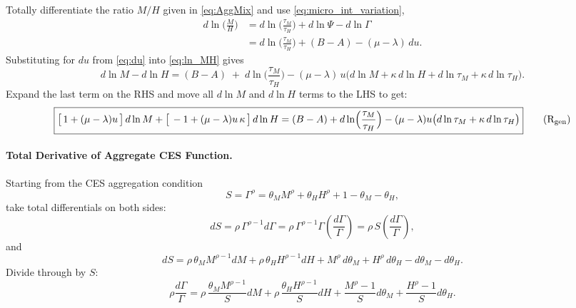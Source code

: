 \documentclass[english]{article}
\begin{document}
Totally differentiate the ratio $M/H$ given in \eqref{eq:AggMix} and use \eqref{eq:micro_int_variation},
\begin{align}
d\ln\!\Big(\frac{M}{H}\Big)
&= d\ln\!\Big(\frac{\tau_M}{\tau_H}\Big) + d\ln\Psi - d\ln\Gamma  \nonumber
\\ 
&= d\ln\!\Big(\frac{\tau_M}{\tau_H}\Big)
+ (B-A) - (\mu-\lambda)\,du.\label{eq:ln_MH}
\end{align}
Substituting for $du$ from \eqref{eq:du} into \eqref{eq:ln_MH} gives
\[
d\ln M - d\ln H
= (B-A) \;+\; d\ln\!\Big(\frac{\tau_M}{\tau_H}\Big) - (\mu-\lambda)\, u\Big(d\ln M + \kappa\,d\ln H + d\ln \tau_M + \kappa\,d\ln \tau_H\Big).
\]
Expand the last term on the RHS and move all $d\ln M$ and $d\ln H$ terms to the LHS to get:
\begin{equation}
\boxed{
\big[\,1 + (\mu-\lambda)u\,\big]\,d\ln M
+ \big[\, -1 + (\mu-\lambda)u\,\kappa\,\big]\,d\ln H
=
(B-A) + d\ln\!\Big(\frac{\tau_M}{\tau_H}\Big)
 - (\mu-\lambda)u\big(d\ln \tau_M + \kappa\,d\ln \tau_H\big)
}
\tag{$\mathrm{R}_{\mathrm{gen}}$}\label{eq:Rgen}
\end{equation}







\paragraph{Total Derivative of Aggregate CES Function.}
Starting from the CES aggregation condition
\[
S = \Gamma^\rho = \theta_M M^\rho + \theta_H H^\rho + 1 - \theta_M - \theta_H,
\]
take total differentials on both sides:
\[
dS
= \rho\,\Gamma^{\rho-1} d\Gamma
= \rho\,\Gamma^{\rho-1} \Gamma \left( \frac{d\Gamma}{\Gamma} \right)
= \rho\,S \left( \frac{d\Gamma}{\Gamma} \right),
\]
and
\[
dS
= \rho\,\theta_M M^{\rho-1} dM + \rho\,\theta_H H^{\rho-1} dH
+ M^\rho\,d\theta_M + H^\rho\,d\theta_H - d\theta_M - d\theta_H.
\]
Divide through by \(S\):
\[
\rho \frac{d\Gamma}{\Gamma}
= \rho\,\frac{\theta_M M^{\rho-1}}{S} dM + \rho\,\frac{\theta_H H^{\rho-1}}{S} dH
+ \frac{M^\rho - 1}{S} d\theta_M + \frac{H^\rho - 1}{S} d\theta_H.
\]
\end{document}
